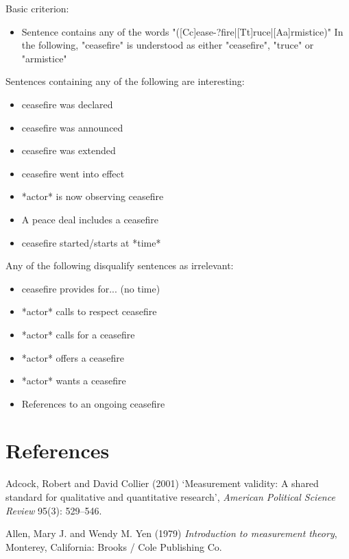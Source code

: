 \documentclass[12pt,twoside]{reedthesis}
\begin{document}
Basic criterion:
\begin{itemize}
\item Sentence contains any of the words "([Cc]ease-?fire|[Tt]ruce|[Aa]rmistice)" 
In the following, "ceasefire" is understood as either "ceasefire", "truce" or "armistice"
\end{itemize}
Sentences containing any of the following are interesting:
\begin{itemize}
\item ceasefire was declared
\item ceasefire was announced 
\item ceasefire was extended 
\item ceasefire went into effect 
\item *actor* is now observing ceasefire
\item A peace deal includes a ceasefire
\item ceasefire started/starts at *time*
\end{itemize}
Any of the following disqualify sentences as irrelevant:
\begin{itemize}
\item ceasefire provides for... (no time)
\item *actor* calls to respect ceasefire
\item *actor* calls for a ceasefire
\item *actor* offers a ceasefire
\item *actor* wants a ceasefire
\item References to an ongoing ceasefire 
\end{itemize}
\backmatter

\chapter*{References}\label{references}


\noindent

\setlength{\parindent}{-0.20in} \setlength{\leftskip}{0.20in}
\setlength{\parskip}{8pt}

\hypertarget{refs}{}
\hypertarget{ref-adcock_measurement_2001}{}
Adcock, Robert and David Collier (2001) `Measurement validity: A shared
standard for qualitative and quantitative research', \emph{American
Political Science Review} 95(3): 529--546.

\hypertarget{ref-allen_introduction_1979}{}
Allen, Mary J. and Wendy M. Yen (1979) \emph{Introduction to measurement
theory}, Monterey, California: Brooks / Cole Publishing Co.
\end{document}
